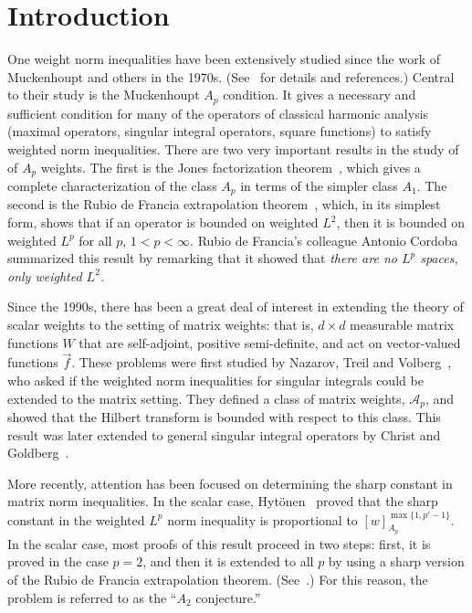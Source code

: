 \documentclass[12pt]{amsart}
\theoremstyle{definition}
\theoremstyle{remark}
\numberwithin{equation}{section}
\newcommand{\A}{\mathcal A}
\newcommand{\vecf}{\vec{f}}
\begin{document}
\section{Introduction}
One weight norm inequalities have been extensively studied since the
work of Muckenhoupt and others in the
1970s.  (See~\cite{duoandikoetxea01,garcia-cuerva-rubiodefrancia85,grafakos08b}
for details and references.)  Central to their study is the
Muckenhoupt $A_p$ condition.  It gives a necessary and sufficient
condition for many of the operators of classical harmonic analysis
(maximal operators, singular integral operators, square functions) to
satisfy weighted norm inequalities.   There are two very important results in
the study of of $A_p$ weights.  The first is  the Jones factorization
theorem~\cite{Jones}, which gives a complete characterization of the
class $A_p$ in terms of the simpler class $A_1$.  The second is the Rubio de
Francia extrapolation theorem~\cite{Rubio}, which, in its
simplest form, shows that if an operator is bounded on weighted $L^2$, then
it is bounded on weighted $L^p$ for all $p$, $1<p<\infty$.   Rubio de
Francia's colleague Antonio Cordoba~\cite{garcia-cuerva87} summarized this result by
remarking that it showed that  {\em there are no $L^p$ spaces, only weighted $L^2$.}


Since the 1990s, there has been a great deal of interest in extending
the theory of scalar weights to the setting of matrix weights:  that
is, $d\times d$ measurable matrix functions $W$ that are self-adjoint,
positive semi-definite, and act on vector-valued functions $\vecf$.
These problems were first studied by Nazarov, Treil and
Volberg~\cite{MR1428988,MR1428818,MR1423034,MR1478786}, who asked if the
weighted norm inequalities for singular integrals could be extended to
the matrix setting.  They defined a class of matrix weights, $\A_p$, and
showed that the Hilbert transform is bounded with respect to this
class.  This result was later extended to general singular integral
operators by Christ and Goldberg~\cite{MR2015733,CG}.

More recently, attention has been focused on determining the sharp
constant in matrix norm inequalities.  In the scalar case,
Hyt\"onen~\cite{hytonenP2010} proved that the sharp constant in the
weighted $L^p$ norm inequality is proportional to
$[w]_{A_p}^{\max\{1,p'-1\}}$.  In the scalar case, most proofs of this
result proceed in two steps: first, it is proved in the case $p=2$,
and then it is extended to all $p$ by using a sharp version of the
Rubio de Francia extrapolation theorem.
(See~\cite{MR3204859,Lern2012,MR2140200}.) For this reason, the
problem is referred to as the ``$A_2$ conjecture.''
\end{document}
